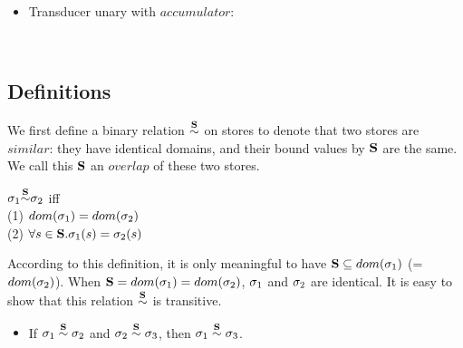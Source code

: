 \begin{itemize}
\begin{mdframed}
\begin{itemize}
\\[2ex]


\item Transducer unary with $accumulator$: \\


 \\


\end{itemize}
\end{mdframed}


\end{itemize}





\subsection{Definitions}
We first define a binary relation $\~\S$ on stores to denote that two stores are $similar$: they have identical domains, and their bound values by $\S$ are the same. 
We call this $\S$ an $overlap$ of these two stores.

\begin{defi}
	\label{def-sgm-sim}
	
	$\sgm_1 {\~{\S}} \sgm_2 $
	iff \\
	(1) $dom(\sgm_1) = dom(\sgm_2)$ \\
	(2) $\forall s \in \S.\sgm_1(s)= \sgm_2(s)$ \\
\end{defi}

According to this definition, it is only meaningful to have $\S  \subseteq dom(\sgm_1)$ (= $dom(\sgm_2)$).  
When $\S = dom(\sgm_1) = dom(\sgm_2)$, $\sgm_1$ and $\sgm_2$ are identical. 
It is easy to show that this relation $\overset{\S}{\sim}$ is transitive.
\begin{itemize}
	\item If $\sgm_1 \~\S \sgm_2$ and $\sgm_2 \~\S \sgm_3$, then $\sgm_1 \~\S \sgm_3$.
	
\end{itemize}


